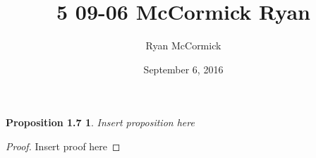 \documentclass[12pt]{amsart}
\begin{document}
\title{5 09-06 McCormick Ryan}
\date{September 6, 2016}
\author{Ryan McCormick}

\maketitle

\theoremstyle{plain}
\newtheorem*{prop1.7}{Proposition 1.7}
\begin{prop1.7}
	Insert proposition here
\end{prop1.7}

\begin{proof}
	Insert proof here
\end{proof}
\end{document}
